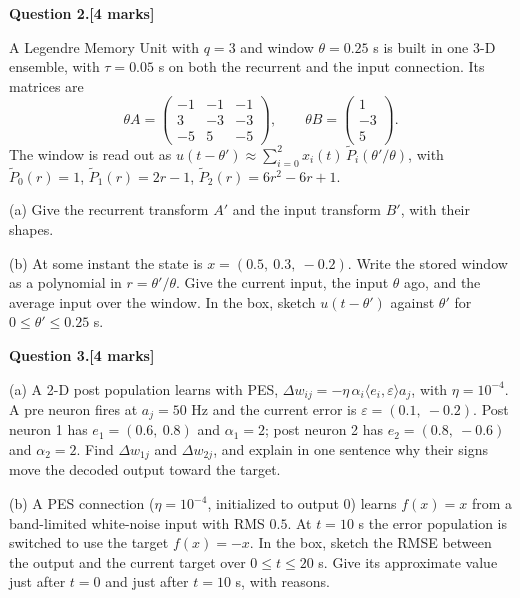 \documentclass[11pt,letterpaper]{article}
\newcommand{\question}[2]{\par\vspace{10pt}\textbf{Question #1.}\hfill\textbf{[#2 marks]}\par}
\newcommand{\answerbox}[1]{\par\noindent\framebox[\linewidth]{\rule{0pt}{#1}}\par}
\begin{document}
\newpage
\question{2}{4}
A Legendre Memory Unit with $q = 3$ and window $\theta = 0.25$ s is built in one 3-D ensemble, with $\tau = 0.05$ s on both the recurrent and the input connection. Its matrices are
\[
\theta A = \begin{pmatrix} -1 & -1 & -1 \\ 3 & -3 & -3 \\ -5 & 5 & -5 \end{pmatrix}, \qquad
\theta B = \begin{pmatrix} 1 \\ -3 \\ 5 \end{pmatrix}.
\]
The window is read out as $u(t - \theta') \approx \sum_{i=0}^{2} x_i(t)\,\tilde P_i(\theta'/\theta)$, with $\tilde P_0(r) = 1$, $\tilde P_1(r) = 2r - 1$, $\tilde P_2(r) = 6r^2 - 6r + 1$.

(a) Give the recurrent transform $A'$ and the input transform $B'$, with their shapes.
\vspace{4cm}

(b) At some instant the state is $x = (0.5,\ 0.3,\ -0.2)$. Write the stored window as a polynomial in $r = \theta'/\theta$. Give the current input, the input $\theta$ ago, and the average input over the window. In the box, sketch $u(t - \theta')$ against $\theta'$ for $0 \le \theta' \le 0.25$ s.
\answerbox{5cm}

\newpage
\question{3}{4}
(a) A 2-D post population learns with PES, $\Delta w_{ij} = -\eta\,\alpha_i\langle e_i, \varepsilon\rangle a_j$, with $\eta = 10^{-4}$. A pre neuron fires at $a_j = 50$ Hz and the current error is $\varepsilon = (0.1,\ -0.2)$. Post neuron 1 has $e_1 = (0.6,\ 0.8)$ and $\alpha_1 = 2$; post neuron 2 has $e_2 = (0.8,\ -0.6)$ and $\alpha_2 = 2$. Find $\Delta w_{1j}$ and $\Delta w_{2j}$, and explain in one sentence why their signs move the decoded output toward the target.
\vspace{4.6cm}

(b) A PES connection ($\eta = 10^{-4}$, initialized to output $0$) learns $f(x) = x$ from a band-limited white-noise input with RMS $0.5$. At $t = 10$ s the error population is switched to use the target $f(x) = -x$. In the box, sketch the RMSE between the output and the current target over $0 \le t \le 20$ s. Give its approximate value just after $t = 0$ and just after $t = 10$ s, with reasons.
\answerbox{5cm}
\end{document}
